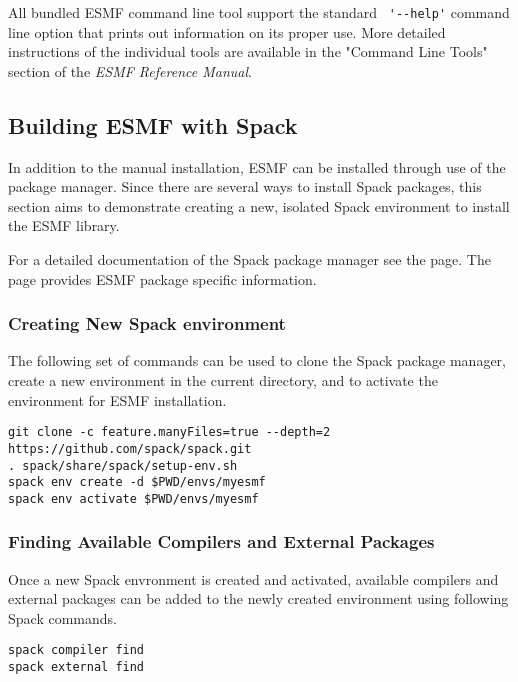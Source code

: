 All bundled ESMF command line tool support the standard \verb+ '--help'+ command
line option that prints out information on its proper use. More detailed
instructions of the individual tools are available in the "Command Line Tools"
section of the {\it ESMF Reference Manual}.

\subsection{Building ESMF with Spack}

In addition to the manual installation, ESMF can be installed through use of the  package manager. Since there are several ways to install Spack packages, this section aims to demonstrate creating a new, isolated Spack environment to install the ESMF library.

For a detailed documentation of the Spack package manager see the  page. The  page provides ESMF package specific information.

\subsubsection{Creating New Spack environment}

The following set of commands can be used to clone the Spack package manager, create a new environment in the current directory, and to activate the environment for ESMF installation.

\begin{verbatim}
git clone -c feature.manyFiles=true --depth=2 https://github.com/spack/spack.git
. spack/share/spack/setup-env.sh
spack env create -d $PWD/envs/myesmf
spack env activate $PWD/envs/myesmf
\end{verbatim}

\subsubsection{Finding Available Compilers and External Packages}

Once a new Spack envronment is created and activated, available compilers and external packages can be added to the newly created environment using following Spack commands.

\begin{verbatim}
spack compiler find
spack external find
\end{verbatim}

